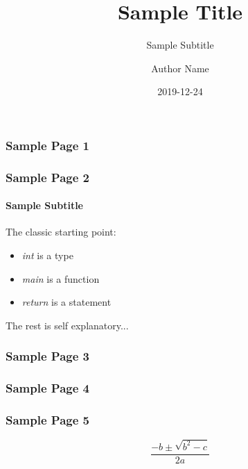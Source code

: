 \title{Sample Title}
\subtitle{Sample Subtitle}
\author{Author Name}
\date{2019-12-24}
\maketitle


\begin{frame}[fragile]
  \frametitle{Sample Page 1}
\end{frame}

\begin{frame}[fragile]
  \frametitle{Sample Page 2}
  \framesubtitle{Sample Subtitle}
  The classic starting point:
  \begin{itemize}
    \item \emph{int} is a type
    \item \emph{main} is a function
    \item \emph{return} is a statement
  \end{itemize}
  The rest is self explanatory...
\end{frame}


\begin{frame}
  \frametitle{Sample Page 3}
\end{frame}

\begin{frame}
  \frametitle{Sample Page 4}
\end{frame}

\begin{frame}
  \frametitle{Sample Page 5}
  \[\frac{-b \pm \sqrt{b^2 - c}}{2a}\]
\end{frame}

